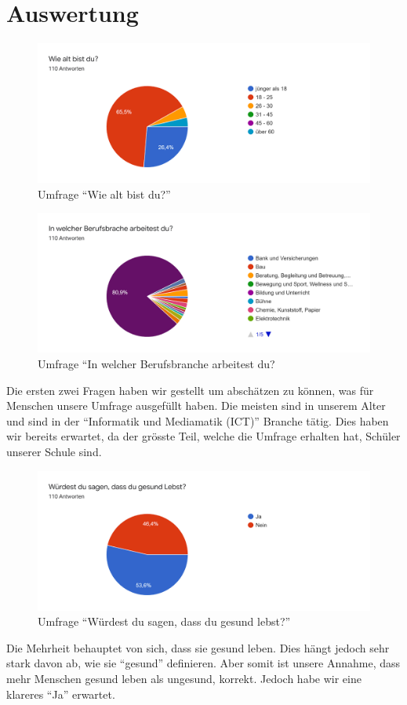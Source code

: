 \section{Auswertung}
\authortoc{\dario}{\sectionident}
\begin{figure}[H]
  \centering
  \includegraphics[width=0.7\linewidth]{./images/umfrage_a.png}
  \caption{Umfrage “Wie alt bist du?”}
  \label{fig:umfrage_a}
\end{figure}
\begin{figure}[H]
  \centering
  \includegraphics[width=0.7\linewidth]{./images/umfrage_b.png}
  \caption{Umfrage “In welcher Berufsbranche arbeitest du?}
  \label{fig:umfrage_b}
\end{figure}
Die ersten zwei Fragen haben wir gestellt um abschätzen zu können, was für Menschen unsere Umfrage ausgefüllt haben. Die meisten sind in unserem Alter und sind in der “Informatik und Mediamatik (ICT)” Branche tätig. Dies haben wir bereits erwartet, da der grösste Teil, welche die Umfrage erhalten hat, Schüler unserer Schule sind.
\begin{figure}[H]
  \centering
  \includegraphics[width=0.7\linewidth]{./images/umfrage_c.png}
  \caption{Umfrage “Würdest du sagen, dass du gesund lebst?”}
  \label{fig:umfrage_c}
\end{figure}
Die Mehrheit behauptet von sich, dass sie gesund leben. Dies hängt jedoch sehr stark davon ab, wie sie “gesund” definieren. Aber somit ist unsere Annahme, dass mehr Menschen gesund leben als ungesund, korrekt. Jedoch habe wir eine klareres  “Ja” erwartet.
